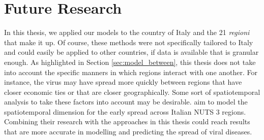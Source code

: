 \documentclass[12pt]{article}
\begin{document}
	
	\section{Future Research} \label{sec:future_research}
	
	In this thesis, we applied our models to the country of Italy and the 21 \textit{regioni} that make it up. Of course, these methods were not specifically tailored to Italy and could easily be applied to other countries, if data is available that is granular enough. As highlighted in Section \ref{sec:model_between}, this thesis does not take into account the specific manners in which regions interact with one another. For instance, the virus may have spread more quickly between regions that have closer economic ties or that are closer geographically. Some sort of spatiotemporal analysis to take these factors into account may be desirable. \textcite{giuliani2020modelling} aim to model the spatiotemporal dimension for the early spread across Italian NUTS 3 regions. Combining their research with the approaches in this thesis could reach results that are more accurate in modelling and predicting the spread of viral diseases. \\
	
\end{document}
